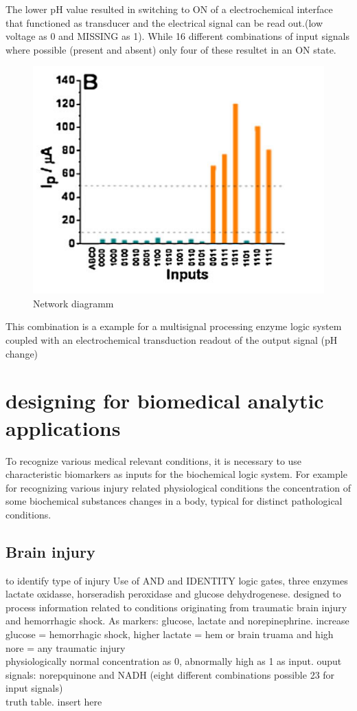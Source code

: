 \documentclass[runningheads]{llncs}
\begin{document}
		The lower pH value resulted in switching to ON of a electrochemical interface that functioned as transducer and the electrical signal can be read out.(low voltage as 0 and MISSING as 1). While 16 different combinations of input signals where possible (present and absent) only four of these resultet in an ON state.
		\begin{figure}[H] \centering \includegraphics[scale= 0.4]{pics/ph.png} \caption{Network diagramm} \label{img:ph} \end{figure}
	
	
		This combination is a example for a multisignal processing enzyme logic system coupled with an electrochemical transduction readout of the output signal (pH change)



\section{designing for biomedical analytic applications}
	To recognize various medical relevant conditions, it is necessary to use characteristic biomarkers as inputs for the biochemical logic system. 
	For example for recognizing various injury related physiological conditions the concentration of some biochemical substances changes in a body, typical for distinct pathological conditions.
	\subsection{Brain injury}
	to identify type of injury
	Use of AND and IDENTITY logic gates, three enzymes lactate oxidasse, horseradish peroxidase and glucose dehydrogenese. designed to process information related to conditions originating from traumatic brain injury and hemorrhagic shock.
	As markers: glucose, lactate and norepinephrine.
	increase glucose = hemorrhagic shock, higher lactate = hem or brain truama and high nore = any traumatic injury \\
	physiologically normal concentration as 0, abnormally high as 1 as input.
	ouput signals: norepquinone and NADH (eight different combinations possible 23 for input signals)\\
	truth table. insert here 
	
\end{document}

